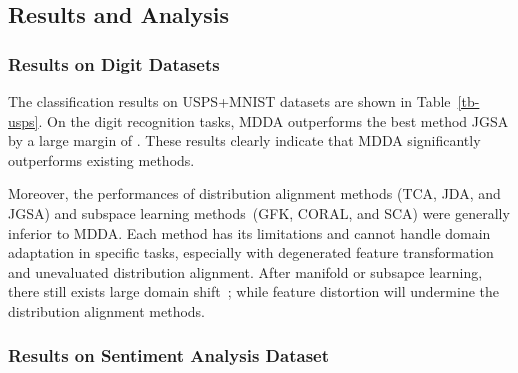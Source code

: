 \documentclass[acmsmall]{acmart}
\begin{document}
\subsection{Results and Analysis}

\subsubsection{Results on Digit Datasets}
The classification results on USPS+MNIST datasets are shown in Table~\ref{tb-usps}. On the digit recognition tasks, MDDA outperforms the best method JGSA by a large margin of . These results clearly indicate that MDDA significantly outperforms existing methods.

Moreover, the performances of distribution alignment methods (TCA, JDA, and JGSA) and subspace learning methods~(GFK, CORAL, and SCA) were generally inferior to MDDA. Each method has its limitations and cannot handle domain adaptation in specific tasks, especially with degenerated feature transformation and unevaluated distribution alignment. After manifold or subsapce learning, there still exists large domain shift~\cite{baktashmotlagh2013unsupervised}; while feature distortion will undermine the distribution alignment methods. 

\begin{table}[htbp]
	\centering
	\caption{Classification accuracy (\%) on USPS-MNIST datasets with SURF features}
	\vspace{-.1in}
	\label{tb-usps}
	\vspace{-.1in}
\end{table}

\subsubsection{Results on Sentiment Analysis Dataset}
\end{document}
